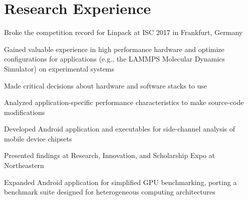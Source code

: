 \documentclass[]{deedy-resume-openfont}
\begin{document}
\vspace{-0.7mm}
\section{\hfill Research Experience \hfill}

\vspace{0.138mm}
\vspace{1.25mm}
\begin{tightemize}
\item Broke the competition record for Linpack at ISC 2017 in Frankfurt, Germany
\item Gained valuable experience in high performance hardware and optimize configurations for applications (e.g., the LAMMPS Molecular Dynamics Simulator) on experimental systems
\item Made critical decisions about hardware and software stacks to use
\item Analyzed application-specific performance characteristics to make source-code modifications
\end{tightemize}

\vspace{2mm}
\vspace{0.1mm}
\vspace{1.3mm}
\begin{tightemize}
\item Developed Android application and executables for side-channel analysis of mobile device chipsets
\item Presented findings at Research, Innovation, and Scholarship Expo at Northeastern
\item Expanded Android application for simplified GPU benchmarking, porting a benchmark suite designed for heterogeneous computing architectures
\end{tightemize}

\vspace{-1mm}
\end{document}

